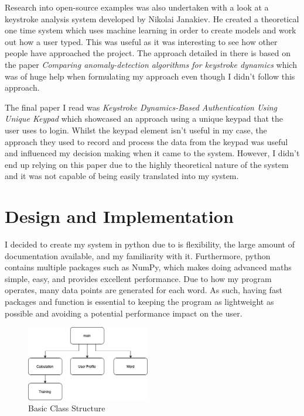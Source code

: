 \documentclass[10pt,a4paper]{report}
\begin{document}
Research into open-source examples was also undertaken with a look at a keystroke analysis system developed by Nikolai Janakiev\cite{janakiev_2018}. He created a theoretical one time system which uses machine learning in order to create models and work out how a user typed. This was useful as it was interesting to see how other people have approached the project. The approach detailed in there is based on the paper \emph{Comparing anomaly-detection algorithms for keystroke dynamics}\cite{5270346} which was of huge help when formulating my approach even though I didn't follow this approach.

The final paper I read was \emph{Keystroke Dynamics-Based Authentication Using Unique Keypad}\cite{s21062242} which showcased an approach using a unique keypad that the user uses to login. Whilst the keypad element isn't useful in my case, the approach they used to record and process the data from the keypad was useful and influenced my decision making when it came to the system. However, I didn't end up relying on this paper due to the highly theoretical nature of the system and it was not capable of being easily translated into my system.

\chapter{Design and Implementation}

I decided to create my system in python due to is flexibility, the large amount of documentation available, and my familiarity with it. Furthermore, python contains multiple packages such as NumPy, which makes doing advanced maths simple, easy, and provides excellent performance. Due to how my program operates, many data points are generated for each word. As such, having fast packages and function is essential to keeping the program as lightweight as possible and avoiding a potential performance impact on the user.

\begin{figure}
	\begin{center}
		\includegraphics[width=0.48\textwidth]{OOP}
	\end{center}
	\caption{Basic Class Structure}
	\label{fig:ClassStruct}
\end{figure}
\end{document}
